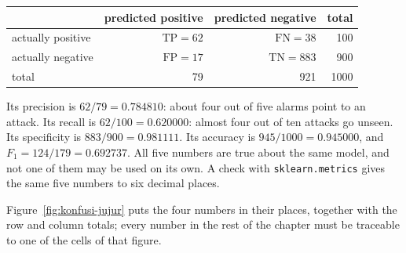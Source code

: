 \begin{center}
\small
\begin{tabular}{l|rr|r}
\hline
 & predicted positive & predicted negative & total \\
\hline
actually positive & $\mathrm{TP}=62$ & $\mathrm{FN}=38$ & 100 \\
actually negative & $\mathrm{FP}=17$ & $\mathrm{TN}=883$ & 900 \\
\hline
total & 79 & 921 & 1000 \\
\hline
\end{tabular}
\end{center}

Its precision is $62/79=0.784810$: about four out of five alarms point to an attack. Its recall is
$62/100=0.620000$: almost four out of ten attacks go unseen. Its specificity is
$883/900=0.981111$. Its accuracy is $945/1000=0.945000$, and $F_1=124/179=0.692737$. All five
numbers are true about the same model, and not one of them may be used on its own. A check with
\texttt{sklearn.metrics} gives the same five numbers to six decimal places.

Figure~\ref{fig:konfusi-jujur} puts the four numbers in their places, together with the row and
column totals; every number in the rest of the chapter must be traceable to one of the cells of
that figure.

